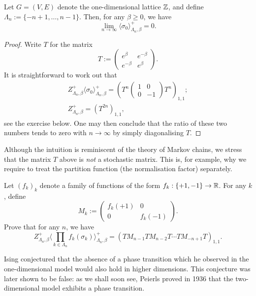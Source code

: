 \begin{theorem}[Ising, 1924]
    Let $G=(V,E)$ denote the one-dimensional lattice $\mathbb Z$,
    and define $\Lambda_n:=\{-n+1,\ldots,n-1\}$.
    Then, for any $\beta\geq 0$, we have
    \[
        \lim_{n\to\infty}\langle\sigma_0\rangle_{\Lambda_n,\beta}^+
        =
        0
        .
    \]
\end{theorem}

\begin{proof}
    Write $T$ for the matrix
    \[
        T:=
        \begin{pmatrix}
            e^{\beta} & e^{-\beta} \\
            e^{-\beta} & e^{\beta}
        \end{pmatrix}.
    \]
    It is straightforward to work out that
    \begin{gather}
        Z_{\Lambda_n,\beta}^+\langle\sigma_0\rangle_{\Lambda_n,\beta}^+
        =
        \left(T^n
            \begin{pmatrix}
                1 & 0 \\ 0 & -1
            \end{pmatrix}
            T^n
            \right)_{1,1};
        \\
        Z_{\Lambda_n,\beta}^+ = \left(T^{2n}\right)_{1,1},
    \end{gather}
    see the exercise below.
    One may then conclude that the ratio of these two numbers tends to zero 
    with $n\to\infty$
    by simply diagonalising $T$.
\end{proof}

\begin{remark}
    Although the intuition is reminiscent
    of the theory of Markov chains, we stress that the matrix
    $T$ above is \emph{not} a stochastic matrix.
    This is, for example, why we require to treat the partition function
    (the normalisation factor) separately.
\end{remark}

\begin{exercise}
    Let $(f_k)_k$ denote a family of functions
    of the form $f_k:\{+1,-1\}\to\mathbb R$.
    For any $k$, define
    \[ M_k:=\begin{pmatrix}
        f_{k}(+1) & 0 \\
        0 & f_{k}(-1)
    \end{pmatrix}.\] 
    Prove that for any $n$,
    we have
    \[
        Z_{\Lambda_n,\beta}^+
        \langle\textstyle\prod_{k\in\Lambda_n} f_k(\sigma_{k})\rangle_{\Lambda_n,\beta}^+
        =
        \left(
            T
            M_{n-1}
            T
            M_{n-2}
            T
            \cdots
            T
            M_{-n+1}
            T
        \right)_{1,1}.
    \]
\end{exercise}

\begin{remark}
    Ising conjectured that the absence of a phase transition which he observed
    in the one-dimensional model would also hold in higher dimensions.
    This conjecture was later shown to be false:
    as we shall soon see, Peierls proved in 1936 that the two-dimensional model
    exhibits a phase transition.
\end{remark}
